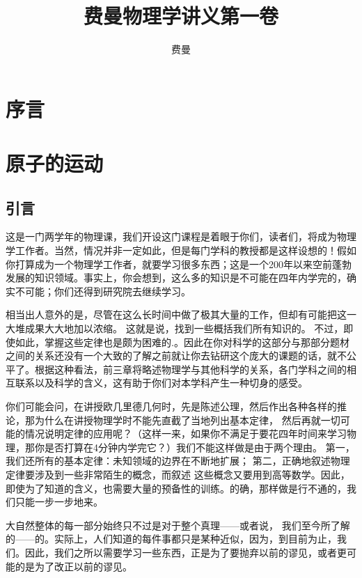\documentclass[12pt,oneside]{book}
\title{费曼物理学讲义第一卷}
\author{费曼}
\begin{document}
\makemytitleA



\frontmatter 
{}
\chapter*{序言}


\setcounter{tocdepth}{2}    
\tableofcontents



\mainmatter

\chapter{原子的运动}

\section{引言}
这是一门两学年的物理课，我们开设这门课程是着眼于你们，读者们，将成为物理学工作者。当然，情况并非一定如此，但是每门学科的教授都是这样设想的！假如你打算成为一个物理学工作者，就要学习很多东西；这是一个200年以来空前蓬勃发展的知识领域。事实上，你会想到，这么多的知识是不可能在四年内学完的，确实不可能；你们还得到研究院去继续学习。

相当出人意外的是，尽管在这么长时间中做了极其大量的工作，但却有可能把这一大堆成果大大地加以浓缩。 这就是说，找到一些概括我们所有知识的。 不过，即使如此，掌握这些定律也是颇为困难的.。因此在你对科学的这部分与那部分题材之间的关系还没有一个大致的了解之前就让你去钻研这个庞大的课题的话，就不公平了。根据这种看法，前三章将略述物理学与其他科学的关系，各门学科之间的相互联系以及科学的含义，这有助于你们对本学科产生一种切身的感受。

你们可能会问，在讲授欧几里德几何时，先是陈述公理，然后作出各种各样的推论，那为什么在讲授物理学时不能先直截了当地列出基本定律， 然后再就一切可能的情况说明定律的应用呢？（这样一来，如果你不满足于要花四年时间来学习物理，那你是否打算在4分钟内学完它？）我们不能这样做是由于两个理由。 第一，我们还所有的基本定律：未知领域的边界在不断地扩展； 第二，正确地叙述物理定律要涉及到一些非常陌生的概念，而叙述
这些概念又要用到高等数学。因此，即使为了知道的含义，也需要大量的预备性的训练。的确，那样做是行不通的，我们只能一步一步地来。

大自然整体的每一部分始终只不过是对于整个真理——或者说， 我们至今所了解的——的。实际上，人们知道的每件事都只是某种近似，因为，到目前为止，我们。因此，我们之所以需要学习一些东西，正是为了要抛弃以前的谬见，或者更可能的是为了改正以前的谬见。
\end{document}
